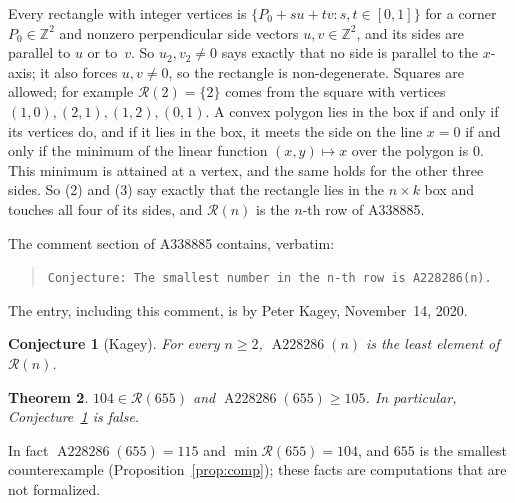 \documentclass[11pt]{amsart}
\theoremstyle{plain}
\newtheorem{theorem}{Theorem}
\newtheorem{conjecture}[theorem]{Conjecture}
\theoremstyle{definition}
\newcommand{\Z}{\mathbb{Z}}
\newcommand{\R}{\mathcal{R}}
\newcommand{\Aa}{\operatorname{A228286}}
\begin{document}
Every rectangle with integer vertices is $\{P_0+su+tv: s,t\in[0,1]\}$ for a corner $P_0\in\Z^2$ and nonzero perpendicular side vectors $u,v\in\Z^2$, and its sides are parallel to $u$ or to~$v$. So $u_2,v_2\ne0$ says exactly that no side is parallel to the $x$-axis; it also forces $u,v\ne0$, so the rectangle is non-degenerate. Squares are allowed; for example $\R(2)=\{2\}$ comes from the square with vertices $(1,0),(2,1),(1,2),(0,1)$. A convex polygon lies in the box if and only if its vertices do, and if it lies in the box, it meets the side on the line $x=0$ if and only if the minimum of the linear function $(x,y)\mapsto x$ over the polygon is $0$. This minimum is attained at a vertex, and the same holds for the other three sides. So (2) and (3) say exactly that the rectangle lies in the $n\times k$ box and touches all four of its sides, and $\R(n)$ is the $n$-th row of A338885.

The comment section of A338885 contains, verbatim:
\begin{quote}
\texttt{Conjecture: The smallest number in the n-th row is A228286(n).}
\end{quote}
The entry, including this comment, is by Peter Kagey, November~14, 2020.

\begin{conjecture}[Kagey]\label{conj}
For every $n\ge2$, $\Aa(n)$ is the least element of $\R(n)$.
\end{conjecture}

\begin{theorem}\label{thm:main}
$104\in\R(655)$ and $\Aa(655)\ge105$. In particular, Conjecture~\ref{conj} is false.
\end{theorem}

In fact $\Aa(655)=115$ and $\min\R(655)=104$, and $655$ is the smallest counterexample (Proposition~\ref{prop:comp}); these facts are computations that are not formalized.
\end{document}
